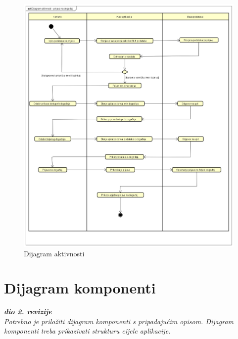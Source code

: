 			\begin{figure}[H]
				\includegraphics[width=\textwidth]{slike/Dijagram_aktivnosti.png}
				\centering
				\caption{Dijagram aktivnosti}
				\label{fig:classd_middle}
			\end{figure}
			
			\eject
		\section{Dijagram komponenti}
		
			\textbf{\textit{dio 2. revizije}}\\
		
			 \textit{Potrebno je priložiti dijagram komponenti s pripadajućim opisom. Dijagram komponenti treba prikazivati strukturu cijele aplikacije.}